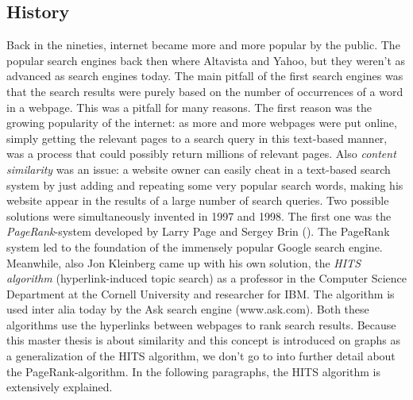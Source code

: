 \documentclass[a4paper,11pt]{report}
\begin{document}
\subsection{History}
Back in the nineties, internet became more and more popular by the public. The popular search 
engines back then where Altavista and Yahoo, but they weren't as advanced as 
search engines today. The main pitfall of the first search engines was that the search results 
were purely based on the number of occurrences of a word in a webpage. This was 
a pitfall for many reasons. The first reason was the growing popularity of the 
internet: as more and more webpages were put online, simply getting the relevant 
pages to a search query in this text-based manner, was a process that could possibly return millions 
of relevant pages. Also \emph{content similarity} was an issue: a website owner 
can easily cheat in a text-based search system by just adding and repeating some 
very popular search words, making his website appear in the results of a large 
number of search queries.
Two possible solutions were simultaneously invented in 1997 and 1998. The first 
one was the
\textit{PageRank}-system developed by Larry Page and Sergey 
Brin (\cite{page}). The PageRank system led to the foundation of the immensely popular Google 
search engine. Meanwhile, also Jon Kleinberg came up with his own solution, the\textit{ HITS algorithm} (hyperlink-induced topic search) as a 
professor in the Computer Science Department at the Cornell University and researcher for IBM. The algorithm is 
used inter alia today by the Ask search engine (www.ask.com).
Both these algorithms use the hyperlinks between webpages to rank search 
results. 
Because this master thesis is about similarity and this concept is 
introduced on graphs as a generalization of the HITS algorithm, we don't go to into 
further detail about the PageRank-algorithm. In the following paragraphs, the 
HITS algorithm is extensively explained.
\end{document}
